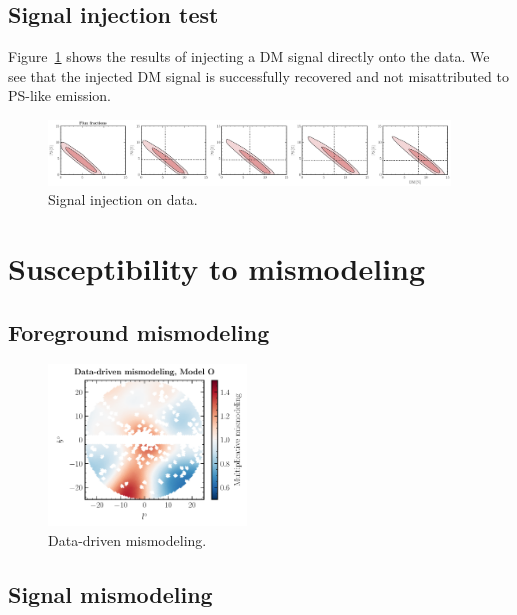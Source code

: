 \documentclass[prd,aps,10pt,nofootinbib,twocolumn,superscriptaddress,preprintnumbers,balancelastpage,longbibliography]{revtex4-1}
\begin{document}
\subsection{Signal injection test}
\label{sec:sig-injection}

Figure~\ref{fig:sig_inj_data} shows the results of injecting a DM signal directly onto the \Fermi data. We see that the injected DM signal is successfully recovered and not misattributed to PS-like emission.

%
\begin{figure}
    \centering
    \includegraphics[width=0.95\textwidth]{plots/data_sig_inj.pdf}
    \caption{Signal injection on data.}
    \label{fig:sig_inj_data}
\end{figure}
%

\section{Susceptibility to mismodeling}
\label{sec:mismodeling}

\subsection{Foreground mismodeling}
\label{sec:fg-mismodeling}

%
\begin{figure}
    \centering
    \includegraphics[width=0.47\textwidth]{plots/dd_mismo_map.pdf}
    \caption{Data-driven mismodeling.}
    \label{fig:dd_mismo_map}
\end{figure}
%


\subsection{Signal mismodeling}
\label{sec:sig-mismodeling}
\end{document}
